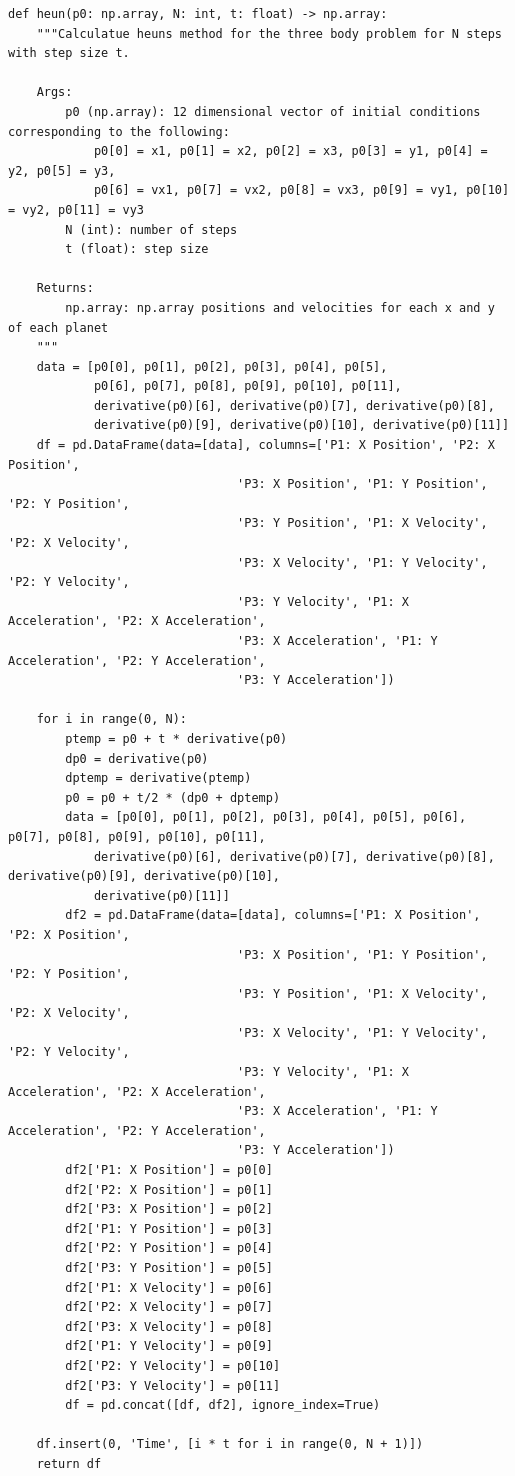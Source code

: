 \documentclass{article}
\begin{document}
\begin{verbatim}
def heun(p0: np.array, N: int, t: float) -> np.array:
    """Calculatue heuns method for the three body problem for N steps with step size t.

    Args:
        p0 (np.array): 12 dimensional vector of initial conditions corresponding to the following:
            p0[0] = x1, p0[1] = x2, p0[2] = x3, p0[3] = y1, p0[4] = y2, p0[5] = y3, 
            p0[6] = vx1, p0[7] = vx2, p0[8] = vx3, p0[9] = vy1, p0[10] = vy2, p0[11] = vy3
        N (int): number of steps
        t (float): step size

    Returns:
        np.array: np.array positions and velocities for each x and y of each planet
    """
    data = [p0[0], p0[1], p0[2], p0[3], p0[4], p0[5], 
            p0[6], p0[7], p0[8], p0[9], p0[10], p0[11], 
            derivative(p0)[6], derivative(p0)[7], derivative(p0)[8], 
            derivative(p0)[9], derivative(p0)[10], derivative(p0)[11]]
    df = pd.DataFrame(data=[data], columns=['P1: X Position', 'P2: X Position', 
                                'P3: X Position', 'P1: Y Position', 'P2: Y Position', 
                                'P3: Y Position', 'P1: X Velocity', 'P2: X Velocity', 
                                'P3: X Velocity', 'P1: Y Velocity', 'P2: Y Velocity', 
                                'P3: Y Velocity', 'P1: X Acceleration', 'P2: X Acceleration', 
                                'P3: X Acceleration', 'P1: Y Acceleration', 'P2: Y Acceleration', 
                                'P3: Y Acceleration'])

    for i in range(0, N):
        ptemp = p0 + t * derivative(p0)
        dp0 = derivative(p0)
        dptemp = derivative(ptemp)
        p0 = p0 + t/2 * (dp0 + dptemp)
        data = [p0[0], p0[1], p0[2], p0[3], p0[4], p0[5], p0[6], p0[7], p0[8], p0[9], p0[10], p0[11], 
            derivative(p0)[6], derivative(p0)[7], derivative(p0)[8], derivative(p0)[9], derivative(p0)[10], 
            derivative(p0)[11]]
        df2 = pd.DataFrame(data=[data], columns=['P1: X Position', 'P2: X Position', 
                                'P3: X Position', 'P1: Y Position', 'P2: Y Position', 
                                'P3: Y Position', 'P1: X Velocity', 'P2: X Velocity', 
                                'P3: X Velocity', 'P1: Y Velocity', 'P2: Y Velocity', 
                                'P3: Y Velocity', 'P1: X Acceleration', 'P2: X Acceleration', 
                                'P3: X Acceleration', 'P1: Y Acceleration', 'P2: Y Acceleration', 
                                'P3: Y Acceleration'])
        df2['P1: X Position'] = p0[0]
        df2['P2: X Position'] = p0[1]
        df2['P3: X Position'] = p0[2]
        df2['P1: Y Position'] = p0[3]
        df2['P2: Y Position'] = p0[4]
        df2['P3: Y Position'] = p0[5]
        df2['P1: X Velocity'] = p0[6]
        df2['P2: X Velocity'] = p0[7]
        df2['P3: X Velocity'] = p0[8]
        df2['P1: Y Velocity'] = p0[9]
        df2['P2: Y Velocity'] = p0[10]
        df2['P3: Y Velocity'] = p0[11]
        df = pd.concat([df, df2], ignore_index=True)
    
    df.insert(0, 'Time', [i * t for i in range(0, N + 1)])
    return df
\end{verbatim}
\end{document}
